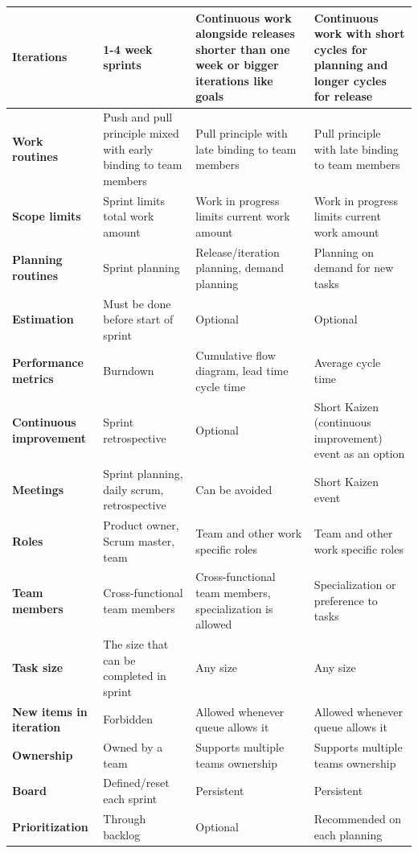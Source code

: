 \begin{center}
\begin{longtable}{| p{2.6cm} | p{3.9cm} | p{3.9cm} | p{3.9cm} |}
    \textbf{Iterations} & 1-4 week sprints & Continuous work alongside releases shorter than one week or bigger iterations like goals & Continuous work with short cycles for planning and longer cycles for release \\ \hline
    \textbf{Work routines} & Push and pull principle mixed with early binding to team members & Pull principle with late binding to team members & Pull principle with late binding to team members \\ \hline
    \textbf{Scope limits} & Sprint limits total work amount & Work in progress limits current work amount & Work in progress limits current work amount \\ \hline
    \textbf{Planning routines} & Sprint planning & Release/iteration planning, demand planning & Planning on demand for new tasks \\ \hline
    \textbf{Estimation} & Must be done before start of sprint & Optional & Optional \\ \hline
    \textbf{Performance metrics} & Burndown & Cumulative flow diagram, lead time cycle time & Average cycle time \\ \hline
    \textbf{Continuous improvement} & Sprint retrospective & Optional & Short Kaizen (continuous improvement) event as an option \\ \hline
    \textbf{Meetings} & Sprint planning, daily scrum, retrospective & Can be avoided & Short Kaizen event \\ \hline
    \textbf{Roles} & Product owner, Scrum master, team & Team and other work specific roles & Team and other work specific roles \\ \hline
    \textbf{Team members} & Cross-functional team members & Cross-functional team members, specialization is allowed & Specialization or preference to tasks \\ \hline
    \textbf{Task size} & The size that can be completed in sprint & Any size & Any size \\ \hline
    \textbf{New items in iteration} & Forbidden & Allowed whenever queue allows it & Allowed whenever queue allows it \\ \hline
    \textbf{Ownership} & Owned by a team & Supports multiple teams ownership & Supports multiple teams ownership \\ \hline
    \textbf{Board} & Defined/reset each sprint & Persistent & Persistent \\ \hline
    \textbf{Prioritization} & Through backlog & Optional & Recommended on each planning \\ \hline

\end{longtable}
\end{center}
